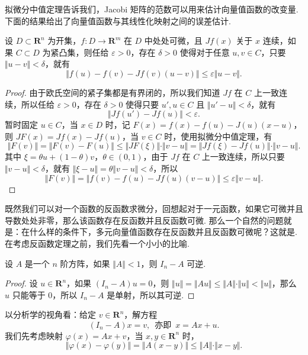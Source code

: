 拟微分中值定理告诉我们，Jacobi 矩阵的范数可以用来估计向量值函数的改变量. 下面的结果给出了向量值函数与其线性化映射之间的误差估计.

\begin{corollary}{}{}
    设 $D\subset \mathbf{R}^n$ 为开集，$f\colon D\to \mathbf{R}^m$ 在 $D$ 中处处可微，且 $Jf(x)$ 关于 $x$ 连续，如果 $C\subset D$ 为紧凸集，则任给 $\varepsilon>0$，存在 $\delta>0$ 使得对于任意 $u, v\in C$，只要 $\Vert u-v\Vert < \delta$，就有\[\Vert f(u) - f(v) - Jf(v)(u-v)\Vert \leqslant \varepsilon\Vert u-v\Vert.\]
\end{corollary}

\begin{proof}
    由于欧氏空间的紧子集都是有界闭的，所以我们知道 $Jf$ 在 $C$ 上一致连续，所以任给 $\varepsilon>0$，存在 $\delta>0$ 使得只要 $u',u\in C$ 且 $\Vert u'-u\Vert < \delta$，就有\[\Vert Jf(u') - Jf(u)\Vert < \varepsilon.\]
    暂时固定 $u\in C$，当 $x\in D$ 时，记 $F(x) = f(x) - f(u) - J(u)(x - u)$，则 $JF(x) = Jf(x) - Jf(u)$，当 $v\in C$ 时，使用拟微分中值定理，有
    \[\Vert F(v)\Vert = \Vert F(v) - F(u)\Vert \leqslant \Vert JF(\xi)\Vert\cdot \Vert v - u\Vert = \Vert Jf(\xi) - Jf(u)\Vert\cdot \Vert v - u\Vert.\]
    其中 $\xi = \theta u + (1-\theta)v$，$\theta\in (0, 1)$，由于 $Jf$ 在 $C$ 上一致连续，所以只要 $\Vert v - u\Vert < \delta$，就有 $\Vert \xi - u\Vert = \theta \Vert v - u\Vert < \delta$，所以\[\Vert F(v)\Vert = \Vert f(v) - f(u) - Jf(u)(v - u)\Vert \leqslant \varepsilon\Vert v - u\Vert.\]
\end{proof}

既然我们可以对一个函数的反函数求微分，回想起对于一元函数，如果它可微并且导数处处非零，那么该函数存在反函数并且反函数可微. 那么一个自然的问题就是：在什么样的条件下，多元向量值函数存在反函数并且反函数可微呢？这就是. 在考虑反函数定理之前，我们先看一个小小的比喻.

\begin{example}{}{}
    设 $A$ 是一个 $n$ 阶方阵，如果 $\Vert A\Vert < 1$，则 $I_n - A$ 可逆.
\end{example}

\begin{proof}
    设 $u\in \mathbf{R}^n$，如果 $(I_n - A)u = 0$，则 $\Vert u\Vert = \Vert Au\Vert \leqslant \Vert A\Vert \cdot \Vert u\Vert < \Vert u\Vert$，那么 $u$ 只能等于 $0$，所以 $I_n - A$ 是单射，所以其可逆.
\end{proof}

以分析学的视角看：给定 $v\in \mathbf{R}^n$，解方程 \[(I_n - A)x = v,\enspace\text{亦即}\enspace x = Ax+u.\]
我们先考虑映射 $\varphi(x) = Ax+v$，当 $x,y\in \mathbf{R}^n$ 时，\[\Vert \varphi(x) - \varphi(y)\Vert = \Vert A(x - y)\Vert\leqslant \Vert A\Vert\cdot \Vert x - y\Vert.\]

